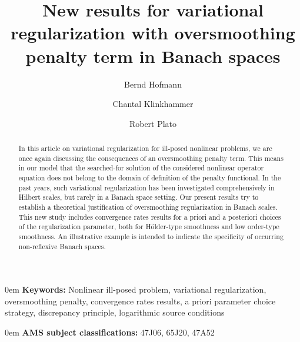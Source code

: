 \documentclass[10pt]{article}
\title{New results for variational regularization with oversmoothing penalty term in Banach spaces}
\author{
Bernd Hofmann\footnotemark[1] \and
Chantal Klinkhammer\footnotemark[2]
\and Robert Plato\footnotemark[2]}
\theoremstyle{definition}
\begin{document}
\date{}
\maketitle

\pgfplotsset{compat = newest}
\renewcommand{\thefootnote}{\fnsymbol{footnote}}

\renewcommand{\theenumcount}{(\alph{enumcount})}

%
\begin{abstract}
In this article on variational regularization for ill-posed nonlinear problems, we are once again discussing the consequences of an oversmoothing penalty term. This means in our model that
the searched-for solution of the considered nonlinear operator equation does not belong to the domain of definition of the penalty functional. In the past years, such variational regularization has been investigated comprehensively in Hilbert scales, but rarely in a Banach space setting. Our
present results try to establish a theoretical justification of oversmoothing regularization in  Banach scales. This new study includes convergence rates results for a priori and a posteriori choices of the regularization parameter, both for H\"older-type smoothness and low order-type smoothness.
An illustrative example is intended to indicate the specificity of occurring non-reflexive Banach spaces.
\end{abstract}

\bigskip

{\parindent0em {\bf Keywords:}
Nonlinear ill-posed problem, variational regularization, oversmoothing penalty, convergence rates results,
a priori parameter choice strategy, discrepancy principle, logarithmic source conditions}

\smallskip

{\parindent0em {\bf AMS subject classifications:} 47J06, 65J20, 47A52}


%
\end{document}
